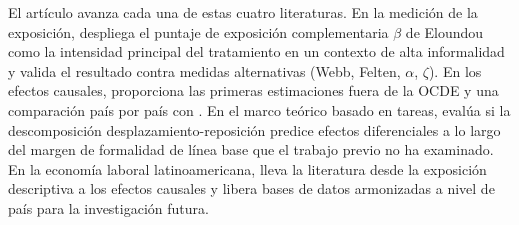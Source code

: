 El art\'{i}culo avanza cada una de estas cuatro literaturas. En la medici\'{o}n de la exposici\'{o}n, despliega el puntaje de exposici\'{o}n complementaria $\beta$ de Eloundou como la intensidad principal del tratamiento en un contexto de alta informalidad y valida el resultado contra medidas alternativas (Webb, Felten, $\alpha$, $\zeta$). En los efectos causales, proporciona las primeras estimaciones fuera de la OCDE y una comparaci\'{o}n pa\'{i}s por pa\'{i}s con \citet{HumlumVestergaard2025_llm}. En el marco te\'{o}rico basado en tareas, eval\'{u}a si la descomposici\'{o}n desplazamiento-reposici\'{o}n predice efectos diferenciales a lo largo del margen de formalidad de l\'{i}nea base que el trabajo previo no ha examinado. En la econom\'{i}a laboral latinoamericana, lleva la literatura desde la exposici\'{o}n descriptiva a los efectos causales y libera bases de datos armonizadas a nivel de pa\'{i}s para la investigaci\'{o}n futura.
